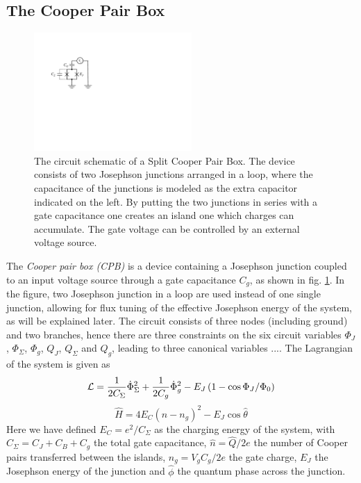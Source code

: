 \subsection{The Cooper Pair Box}

\begin{figure}
	\includegraphics[width=6cm]{"./material/figures/introduction/cooper_pair_box"}
	\caption{The circuit schematic of a Split Cooper Pair Box. The device consists of two Josephson junctions arranged in a loop, where the capacitance of the junctions is modeled as the extra capacitor indicated on the left. By putting the two junctions in series with a gate capacitance one creates an island one which charges can accumulate. The gate voltage can be controlled by an external voltage source.}
	\label{fig:cpb_circuit}
\end{figure}

The {\it Cooper pair box (CPB)} is a device containing a Josephson junction coupled to an input voltage source through a gate capacitance $C_g$, as shown in fig. \ref{fig:cpb_circuit}. In the figure, two Josephson junction in a loop are used instead of one single junction, allowing for flux tuning of the effective Josephson energy of the system, as will be explained later. The circuit consists of  three nodes (including ground) and two branches, hence there are three constraints on the six circuit variables $\Phi_J$, $\Phi_\Sigma$, $\Phi_g$, $Q_J$, $Q_\Sigma$ and $Q_g$, leading to three canonical variables .... The Lagrangian of the system is given as
%
\begin{equation}
\begin{mathcal}L\end{mathcal}=\frac{1}{2C_\Sigma}\dot{\Phi}_\Sigma^2+\frac{1}{2C_g}\dot{\Phi}_g^2-E_J\left(1-\cos{\Phi_J/\Phi_0}\right)
\end{equation}
%
 \citep{cottet_implementation_2002}
%
\begin{equation}
\hat{H} = 4 E_C \left( \hat{n} - n_g\right)^2-E_J \cos{\hat{\theta}}
\end{equation}
%
Here we have defined $E_C = e^2 / C_\Sigma$ as the charging energy of the system, with $C_\Sigma = C_J+C_B+C_g$ the total gate capacitance, $\hat{n}=\hat{Q}/2e$ the number of Cooper pairs transferred between the islands, $n_g=V_g C_g /2e $ the gate charge, $E_J$ the Josephson energy of the junction and $\hat{\phi}$ the quantum phase across the junction.

